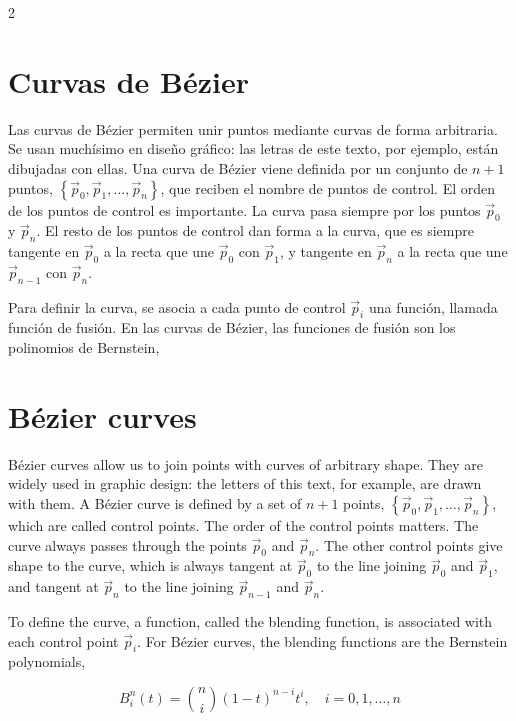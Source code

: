\begin{paracol}{2}
\section{Curvas de Bézier}
Las curvas de Bézier permiten unir puntos mediante curvas de forma arbitraria. Se usan muchísimo en diseño gráfico: las letras de este texto, por ejemplo, están dibujadas con ellas. Una curva de Bézier viene definida por un conjunto de $n+1$ puntos, $\left\lbrace\vec{p}_0, \vec{p}_1, \dots, \vec{p}_n\right\rbrace$, que reciben el nombre de puntos de control. El orden de los puntos de control es importante. La curva pasa siempre por los puntos $\vec{p}_0$ y $\vec{p}_n$. El resto de los puntos de control dan forma a la curva, que es siempre tangente en $\vec{p}_0$ a la recta que une $\vec{p}_0$ con $\vec{p}_1$, y tangente en $\vec{p}_n$ a la recta que une $\vec{p}_{n-1}$ con $\vec{p}_n$.

Para definir la curva, se asocia a cada punto de control $\vec{p}_i$ una función, llamada función de fusión. En las curvas de Bézier, las funciones de fusión son los polinomios de Bernstein, 
\switchcolumn
\section{Bézier curves} 
Bézier curves allow us to join points with curves of arbitrary shape. They are widely used in graphic design: the letters of this text, for example, are drawn with them. A Bézier curve is defined by a set of $n+1$ points, $\left\lbrace\vec{p}_0, \vec{p}_1, \dots, \vec{p}_n\right\rbrace$, which are called control points. The order of the control points matters. The curve always passes through the points $\vec{p}_0$ and $\vec{p}_n$. The other control points give shape to the curve, which is always tangent at $\vec{p}_0$ to the line joining $\vec{p}_0$ and $\vec{p}_1$, and tangent at $\vec{p}_n$ to the line joining $\vec{p}_{n-1}$ and $\vec{p}_n$.

To define the curve, a function, called the blending function, is associated with each control point $\vec{p}_i$. For Bézier curves, the blending functions are the Bernstein polynomials, 
\end{paracol}
\begin{equation*}
B_i^n (t)=\binom{n}{i}\left(1-t\right)^{n-i}t^i, \quad i = 0, 1, \dots, n
\end{equation*}
